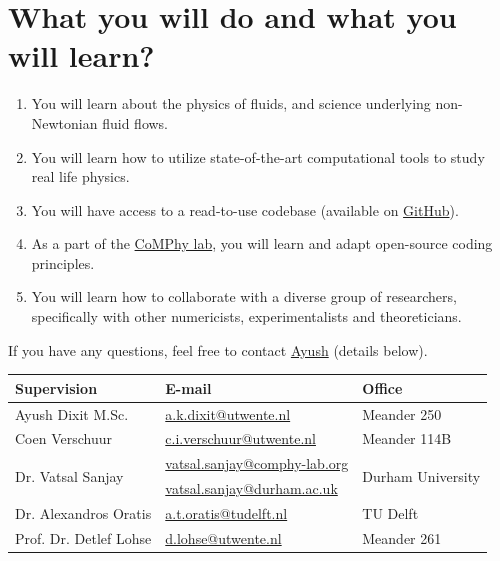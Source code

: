 \documentclass[a4paper,10pt]{article}
\begin{document}
\section*{What you will do and what you will learn?}

\begin{enumerate}
\item You will learn about the physics of fluids, and science underlying non-Newtonian fluid flows. 
\item You will learn how to utilize state-of-the-art computational tools to study real life physics. 
\item You will have access to a read-to-use codebase (available on \href{https://comphy-lab.org/MultiRheoFlow}{GitHub}).
\item As a part of the \href{https://comphy-lab.org}{CoMPhy lab}, you will learn and adapt open-source coding principles. 
\item You will learn how to collaborate with a diverse group of researchers, specifically with other numericists, experimentalists and theoreticians.

\end{enumerate}

If you have any questions, feel free to contact \href{mailto:a.k.dixit@utwente.nl}{Ayush} (details below).
\begin{center}
\begin{tabular}{|l|l|l|}
\hline \textbf{Supervision} & \textbf{E-mail} & \textbf{Office} \\
\hline Ayush Dixit M.Sc. & \href{mailto:a.k.dixit@utwente.nl}{a.k.dixit@utwente.nl} & Meander 250 \\
\hline Coen Verschuur & \href{mailto:c.i.verschuur@utwente.nl}{c.i.verschuur@utwente.nl} & Meander 114B \\
\hline \multirow{2}{*}{Dr. Vatsal Sanjay} & \href{mailto:vatsal.sanjay@comphy-lab.org}{vatsal.sanjay@comphy-lab.org} & \multirow{2}{*}{Durham University} \\
& \href{mailto:vatsal.sanjay@durham.ac.uk}{vatsal.sanjay@durham.ac.uk} & \\
\hline Dr. Alexandros Oratis   & \href{mailto:a.t.oratis@tudelft.nl}{a.t.oratis@tudelft.nl}& TU Delft \\
\hline Prof. Dr. Detlef Lohse & \href{mailto:d.lohse@utwente.nl}{d.lohse@utwente.nl} & Meander 261  \\
\hline
\end{tabular}
\end{center}
\printbibliography
\end{document}
